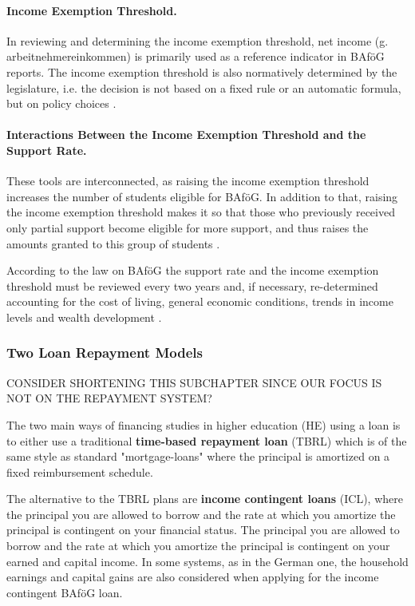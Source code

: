 \paragraph{Income Exemption Threshold.}
In reviewing and determining the income exemption threshold, net income (g. arbeitnehmereinkommen) is primarily used as a reference indicator in BAföG reports. The income exemption threshold is also normatively determined by the legislature, i.e. the decision is not based on a fixed rule or an automatic formula, but on policy choices \citep{meier_bafog_2024}.


\paragraph{Interactions Between the Income Exemption Threshold and the Support Rate.}
These tools are interconnected, as raising the income exemption threshold increases the number of students eligible for BAföG. In addition to that, raising the income exemption threshold makes it so that those who previously received only partial support become eligible for more support, and thus raises the amounts granted to this group of students \citep{meier_bafog_2024}.

According to the law on BAföG the support rate and the income exemption threshold must be reviewed every two years and, if necessary, re-determined accounting for the cost of living, general economic conditions, trends in income levels and wealth development \citep{meier_bafog_2024}.

\subsubsection{Two Loan Repayment Models}
\label{subsection:loan-repayment-plan}

CONSIDER SHORTENING THIS SUBCHAPTER SINCE OUR FOCUS IS NOT ON THE REPAYMENT SYSTEM?

The two main ways of financing studies in higher education (HE) using a loan is to either use a traditional 
\textbf{time-based repayment loan} (TBRL) which is of the same style as standard "mortgage-loans" 
where the principal is amortized on a fixed reimbursement schedule.

The alternative to the TBRL plans are \textbf{income contingent loans} (ICL), where the 
principal you are allowed to borrow and the rate at which you amortize the principal is contingent on your financial status. The principal you are allowed to borrow and the 
rate at which you amortize the principal is contingent on your earned 
and capital income. In some systems, as in the German one, the household earnings 
and capital gains are also considered when applying for the income contingent BAföG loan.

